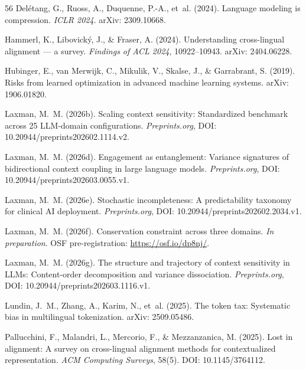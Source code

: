\documentclass[11pt,a4paper]{article}
\begin{document}
\begin{thebibliography}{56}
Del\'{e}tang, G., Ruoss, A., Duquenne, P.-A., et~al. (2024).
\newblock Language modeling is compression.
\newblock \emph{ICLR 2024}.
\newblock arXiv: 2309.10668.

Hammerl, K., Libovick\'{y}, J., \& Fraser, A. (2024).
\newblock Understanding cross-lingual alignment --- a survey.
\newblock \emph{Findings of ACL 2024}, 10922--10943.
\newblock arXiv: 2404.06228.

Hubinger, E., van Merwijk, C., Mikulik, V., Skalse, J., \& Garrabrant, S. (2019).
\newblock Risks from learned optimization in advanced machine learning systems.
\newblock arXiv: 1906.01820.

Laxman, M.~M. (2026b).
\newblock Scaling context sensitivity: Standardized benchmark across 25 {LLM}-domain configurations.
\newblock \emph{Preprints.org}, DOI: 10.20944/preprints202602.1114.v2.

Laxman, M.~M. (2026d).
\newblock Engagement as entanglement: Variance signatures of bidirectional context coupling in large language models.
\newblock \emph{Preprints.org}, DOI: 10.20944/preprints202603.0055.v1.

Laxman, M.~M. (2026e).
\newblock Stochastic incompleteness: A predictability taxonomy for clinical {AI} deployment.
\newblock \emph{Preprints.org}, DOI: 10.20944/preprints202602.2034.v1.

Laxman, M.~M. (2026f).
\newblock Conservation constraint across three domains.
\newblock \emph{In preparation}.
\newblock OSF pre-registration: \url{https://osf.io/dp8nj/}.

Laxman, M.~M. (2026g).
\newblock The structure and trajectory of context sensitivity in {LLMs}: Content-order decomposition and variance dissociation.
\newblock \emph{Preprints.org}, DOI: 10.20944/preprints202603.1116.v1.

Lundin, J.~M., Zhang, A., Karim, N., et~al. (2025).
\newblock The token tax: Systematic bias in multilingual tokenization.
\newblock arXiv: 2509.05486.

Pallucchini, F., Malandri, L., Mercorio, F., \& Mezzanzanica, M. (2025).
\newblock Lost in alignment: A survey on cross-lingual alignment methods for contextualized representation.
\newblock \emph{ACM Computing Surveys}, 58(5).
\newblock DOI: 10.1145/3764112.


\end{thebibliography}
\end{document}
